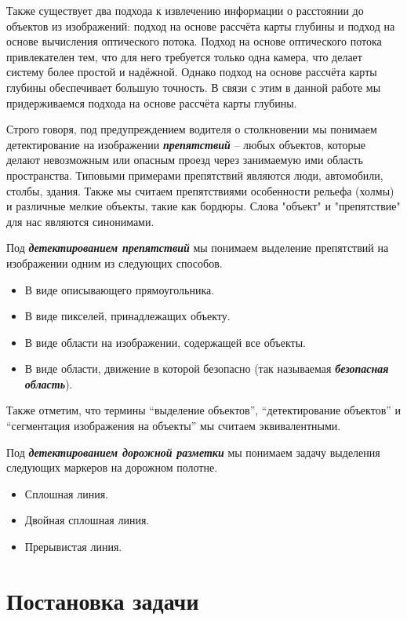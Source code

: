 \documentclass[aps,%
14pt,%
final,%
oneside,
onecolumn,%
musixtex, %
superscriptaddress,%
centertags]{extarticle} %
\begin{document}
Также существует два подхода к извлечению информации о расстоянии до объектов из изображений: подход на основе рассчёта карты глубины и подход на основе вычисления оптического потока. Подход на основе оптического потока привлекателен тем, что для него требуется только одна камера, что делает систему более простой и надёжной. Однако подход на основе рассчёта карты глубины обеспечивает большую точность. В связи с этим в данной работе мы придерживаемся подхода на основе рассчёта карты глубины.

 Строго говоря, под предупреждением водителя о столкновении мы понимаем детектирование на изображении \textit{\textbf{препятствий}} -- любых объектов, которые делают невозможным или опасным проезд через занимаемую ими область пространства. Типовыми примерами препятствий являются люди, автомобили, столбы, здания. Также мы считаем препятствиями особенности рельефа (холмы) и различные мелкие объекты, такие как бордюры. Слова "объект" и "препятствие" для нас являются синонимами. 

Под \textit{\textbf{детектированием препятствий}} мы понимаем выделение препятствий на изображении одним из следующих способов.
\begin{itemize}
    \item В виде описывающего прямоугольника.
    \item В виде пикселей, принадлежащих объекту.
    \item В виде области на изображении, содержащей все объекты.
    \item В виде области, движение в которой безопасно (так называемая \textit{\textbf{безопасная область}}).
\end{itemize}
Также отметим, что термины ``выделение объектов'', ``детектирование объектов'' и ``сегментация изображения на объекты'' мы считаем эквивалентными.

Под \textit{\textbf{детектированием дорожной разметки}} мы понимаем задачу выделения следующих маркеров на дорожном полотне.
\begin{itemize}
    \item Сплошная линия.
    \item Двойная сплошная линия.
    \item Прерывистая линия.
\end{itemize}

\section{Постановка задачи}
\end{document}
